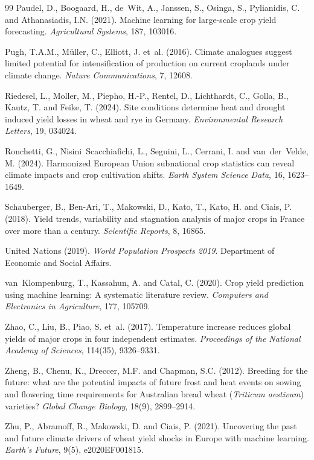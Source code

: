 \documentclass[12pt,a4paper]{report}
\begin{document}
\begin{thebibliography}{99}
Paudel, D., Boogaard, H., de~Wit, A., Janssen, S., Osinga, S., Pylianidis, C. and Athanasiadis, I.N. (2021).
\newblock Machine learning for large-scale crop yield forecasting.
\newblock \emph{Agricultural Systems}, 187, 103016.

Pugh, T.A.M., M\"{u}ller, C., Elliott, J. et~al. (2016).
\newblock Climate analogues suggest limited potential for intensification of production on current croplands under climate change.
\newblock \emph{Nature Communications}, 7, 12608.

Riedesel, L., Moller, M., Piepho, H.-P., Rentel, D., Lichthardt, C., Golla, B., Kautz, T. and Feike, T. (2024).
\newblock Site conditions determine heat and drought induced yield losses in wheat and rye in Germany.
\newblock \emph{Environmental Research Letters}, 19, 034024.

Ronchetti, G., Nisini~Scacchiafichi, L., Seguini, L., Cerrani, I. and van~der~Velde, M. (2024).
\newblock Harmonized European Union subnational crop statistics can reveal climate impacts and crop cultivation shifts.
\newblock \emph{Earth System Science Data}, 16, 1623--1649.

Schauberger, B., Ben-Ari, T., Makowski, D., Kato, T., Kato, H. and Ciais, P. (2018).
\newblock Yield trends, variability and stagnation analysis of major crops in France over more than a century.
\newblock \emph{Scientific Reports}, 8, 16865.

United Nations (2019).
\newblock \emph{World Population Prospects 2019}.
\newblock Department of Economic and Social Affairs.

van~Klompenburg, T., Kassahun, A. and Catal, C. (2020).
\newblock Crop yield prediction using machine learning: A systematic literature review.
\newblock \emph{Computers and Electronics in Agriculture}, 177, 105709.

Zhao, C., Liu, B., Piao, S. et~al. (2017).
\newblock Temperature increase reduces global yields of major crops in four independent estimates.
\newblock \emph{Proceedings of the National Academy of Sciences}, 114(35), 9326--9331.

Zheng, B., Chenu, K., Dreccer, M.F. and Chapman, S.C. (2012).
\newblock Breeding for the future: what are the potential impacts of future frost and heat events on sowing and flowering time requirements for Australian bread wheat (\emph{Triticum aestivum}) varieties?
\newblock \emph{Global Change Biology}, 18(9), 2899--2914.

Zhu, P., Abramoff, R., Makowski, D. and Ciais, P. (2021).
\newblock Uncovering the past and future climate drivers of wheat yield shocks in Europe with machine learning.
\newblock \emph{Earth's Future}, 9(5), e2020EF001815.

\end{thebibliography}
\end{document}
